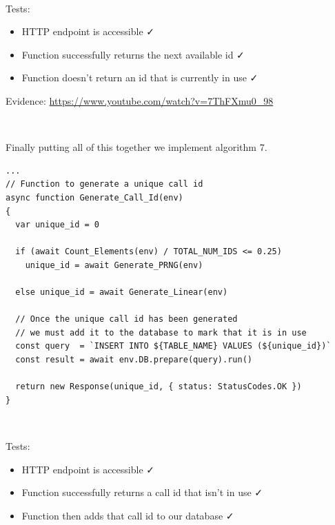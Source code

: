 {\color{gray} \hrulefill} \\ \vspace{0.2cm}

{\sffamily Tests:}

\begin{itemize}
  \item HTTP endpoint is accessible \faCheck \\
  \item Function successfully returns the next available id \faCheck \\
  \item Function doesn't return an id that is currently in use \faCheck \\
\end{itemize}

{\sffamily Evidence:} \url{https://www.youtube.com/watch?v=7ThFXmu0_98}\\ \vspace{0.2cm}

{\color{gray} \hrulefill} \\ \vspace{0.2cm}

Finally putting all of this together we implement algorithm 7.

\begin{verbatim}
...
// Function to generate a unique call id
async function Generate_Call_Id(env)
{
  var unique_id = 0

  if (await Count_Elements(env) / TOTAL_NUM_IDS <= 0.25)
    unique_id = await Generate_PRNG(env)

  else unique_id = await Generate_Linear(env)

  // Once the unique call id has been generated
  // we must add it to the database to mark that it is in use
  const query  = `INSERT INTO ${TABLE_NAME} VALUES (${unique_id})`
  const result = await env.DB.prepare(query).run()

  return new Response(unique_id, { status: StatusCodes.OK })
}
\end{verbatim}

{\color{gray} \hrulefill} \\ \vspace{0.2cm}

{\sffamily Tests:}

\begin{itemize}
  \item HTTP endpoint is accessible \faCheck \\
  \item Function successfully returns a call id that isn't in use \faCheck \\
  \item Function then adds that call id to our database \faCheck \\
\end{itemize}

